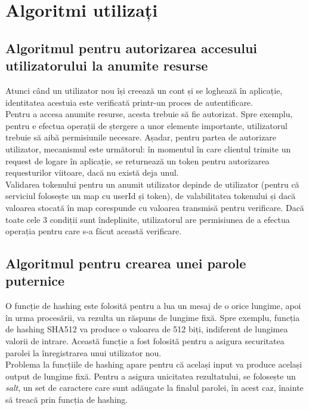 \section{Algoritmi utilizați}
\subsection{Algoritmul pentru autorizarea accesului utilizatorului la anumite resurse}
Atunci când un utilizator nou își creează un cont și se loghează în aplicație, identitatea acestuia este verificată printr-un proces de autentificare. \\
Pentru a accesa anumite resurse, acesta trebuie să fie autorizat. Spre exemplu, pentru e efectua operații de ștergere a unor elemente importante, utilizatorul trebuie să aibă permisiunile necesare.
Așadar, pentru partea de autorizare utilizator, mecanismul este următorul: în momentul în care clientul trimite un request de logare în aplicație, se returnează un token pentru autorizarea requesturilor viitoare, dacă nu există deja unul. \\

Validarea tokenului pentru un anumit utilizator depinde de utilizator (pentru că serviciul folosește un map cu userId și token), de valabilitatea tokenului și dacă valoarea stocată în map corespunde cu valoarea transmisă pentru verificare. 
Dacă toate cele 3 condiții sunt îndeplinite, utilizatorul are permisiunea de a efectua operația pentru care s-a făcut această verificare.

\subsection{Algoritmul pentru crearea unei parole puternice}
O funcție de hashing este folosită pentru a lua un mesaj de o orice lungime, apoi în urma procesării, va rezulta un răspuns de lungime fixă.
Spre exemplu, funcția de hashing SHA512 va produce o valoarea de 512 biți, indiferent de lungimea valorii de intrare. Această funcție a fost folosită pentru a asigura securitatea parolei la înregistrarea unui utilizator nou.\\

Problema la funcțiile de hashing apare pentru că același input va produce același output de lungime fixă. 
Pentru a asigura unicitatea rezultatului, se folosește un {\it salt}, un set de caractere care sunt adăugate la finalul parolei, în acest caz, înainte să treacă prin funcția de hashing.



